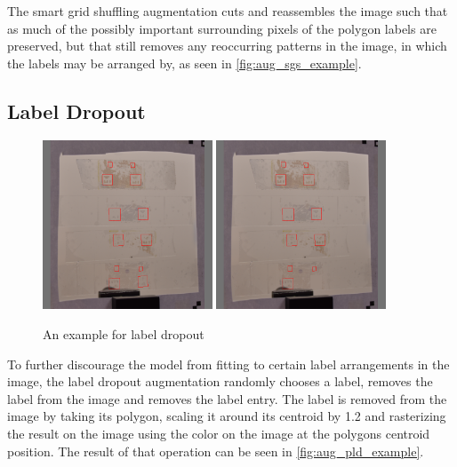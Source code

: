 \documentclass[10pt]{book}
\begin{document}
The smart grid shuffling augmentation cuts and reassembles the image such that as much of the possibly important surrounding pixels of the polygon labels are preserved, but that still removes any reoccurring patterns in the image, in which the labels may be arranged by, as seen in \autoref{fig:aug_sgs_example}.

\subsection{Label Dropout}
\label{sec:aug_ld}

\begin{figure}
  \centering
     {\includegraphics[width=0.45\textwidth]{image/aug_pld_before}}
     {\includegraphics[width=0.45\textwidth]{image/aug_pld_after}}
  \caption{An example for label dropout}
  \label{fig:aug_pld_example}
\end{figure}

To further discourage the model from fitting to certain label arrangements in the image, the label dropout augmentation randomly chooses a label, removes the label from the image and removes the label entry. The label is removed from the image by taking its polygon, scaling it around its centroid by 1.2 and rasterizing the result on the image using the color on the image at the polygons centroid position. The result of that operation can be seen in \autoref{fig:aug_pld_example}.
\end{document}
